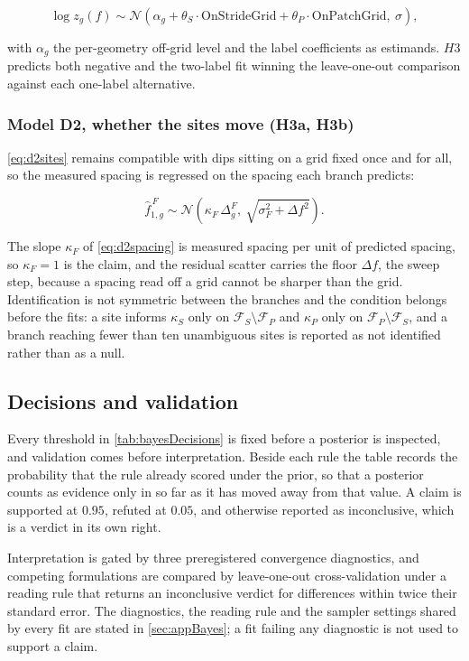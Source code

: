 \begin{equation}
\label{eq:d2sites}
\log z_g(f) \sim \mathcal{N}\!\left(
\alpha_g + \theta_S \cdot \text{OnStrideGrid} + \theta_P \cdot \text{OnPatchGrid},\ \sigma
\right),
\end{equation}

with $\alpha_g$ the per-geometry off-grid level and the label coefficients as estimands. $H3$ predicts both negative and the two-label fit winning the leave-one-out comparison against each one-label alternative.





\subsubsection*{Model D2, whether the sites move (H3a, H3b)}
\autoref{eq:d2sites} remains compatible with dips sitting on a grid fixed once and for all, so the measured spacing is regressed on the spacing each branch predicts:

\begin{equation}
\label{eq:d2spacing}
\hat f^{\,F}_{1,g} \sim \mathcal{N}\!\left(
\kappa_F \,\Delta^F_g,\ \sqrt{\sigma_F^2+\Delta f^2}
\right).
\end{equation}

The slope $\kappa_F$ of \autoref{eq:d2spacing} is measured spacing per unit of predicted spacing, so $\kappa_F=1$ is the claim, and the residual scatter carries the floor $\Delta f$, the sweep step, because a spacing read off a grid cannot be sharper than the grid. Identification is not symmetric between the branches and the condition belongs before the fits: a site informs $\kappa_S$ only on $\mathcal F_S \setminus \mathcal F_P$ and $\kappa_P$ only on $\mathcal F_P \setminus \mathcal F_S$, and a branch reaching fewer than ten unambiguous sites is reported as not identified rather than as a null.



\subsection{Decisions and validation}

Every threshold in \autoref{tab:bayesDecisions} is fixed before a posterior is inspected, and validation comes before interpretation. Beside each rule the table records the probability that the rule already scored under the prior, so that a posterior counts as evidence only in so far as it has moved away from that value. A claim is supported at $0.95$, refuted at $0.05$, and otherwise reported as inconclusive, which is a verdict in its own right.

Interpretation is gated by three preregistered convergence diagnostics, and competing formulations are compared by leave-one-out cross-validation under a reading rule that returns an inconclusive verdict for differences within twice their standard error. The diagnostics, the reading rule and the sampler settings shared by every fit are stated in \autoref{sec:appBayes}; a fit failing any diagnostic is not used to support a claim.
